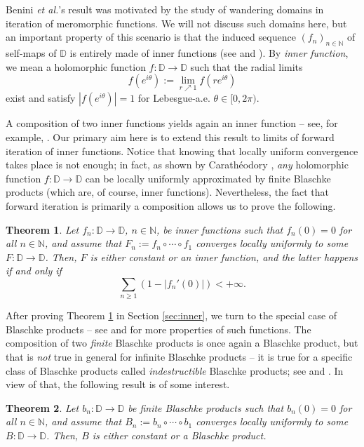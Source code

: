 \documentclass[a4paper,11pt]{article}
\theoremstyle{plain}
\newtheorem{theorem}{Theorem}[section]
\theoremstyle{definition}
\theoremstyle{definition}
\def\D{\mathbb{D}}
\begin{document}
Benini \textit{et al.}'s result was motivated by the study of wandering domains in iteration of meromorphic functions. We will not discuss such domains here, but an important property of this scenario is that the induced sequence $(f_n)_{n\in\mathbb{N}}$ of self-maps of $\D$ is entirely made of inner functions (see \cite[Section 3]{BEFRS19} and \cite[Lemma 2.2]{Fer21}). By \textit{inner function}, we mean a holomorphic function $f:\D\to\D$ such that the radial limits
\[ f(e^{i\theta}) := \lim_{r\nearrow 1} f(re^{i\theta}) \]
exist and satisfy $|f(e^{i\theta})| = 1$ for Lebesgue-a.e. $\theta\in [0, 2\pi)$.

A composition of two inner functions yields again an inner function -- see, for example, \cite[Theorem 2]{Ryf66}. Our primary aim here is to extend this result to limits of forward iteration of inner functions. Notice that knowing that locally uniform convergence takes place is not enough; in fact, as shown by Carath\'eodory \cite{Car54}, \textit{any} holomorphic function $f:\D\to\D$ can be locally uniformly approximated by finite Blaschke products (which are, of course, inner functions). Nevertheless, the fact that forward iteration is primarily a composition allows us to prove the following.
\begin{theorem} \label{thm:inner}
Let $f_n:\D\to\D$, $n\in\mathbb{N}$, be inner functions such that $f_n(0) = 0$ for all $n\in\mathbb{N}$, and assume that $F_n := f_n\circ\cdots\circ f_1$ converges locally uniformly to some $F:\D\to\D$. Then, $F$ is either constant or an inner function, and the latter happens if and only if
\[ \sum_{n\geq 1} (1 - |f_n'(0)|) < +\infty. \]
\end{theorem}

After proving Theorem \ref{thm:inner} in Section \ref{sec:inner}, we turn to the special case of Blaschke products -- see \cite{Dur70} and \cite{GMR16} for more properties of such functions. The composition of two \textit{finite} Blaschke products is once again a Blaschke product, but that is \textit{not} true in general for infinite Blaschke products -- it is true for a specific class of Blaschke products called \textit{indestructible} Blaschke products; see \cite{McL72} and \cite{KR13}. In view of that, the following result is of some interest.
\begin{theorem} \label{thm:blaschke}
Let $b_n:\D\to\D$ be finite Blaschke products such that $b_n(0) = 0$ for all $n\in\mathbb{N}$, and assume that $B_n := b_n\circ\cdots\circ b_1$ converges locally uniformly to some $B:\D\to\D$. Then, $B$ is either constant or a Blaschke product.
\end{theorem}
\end{document}

